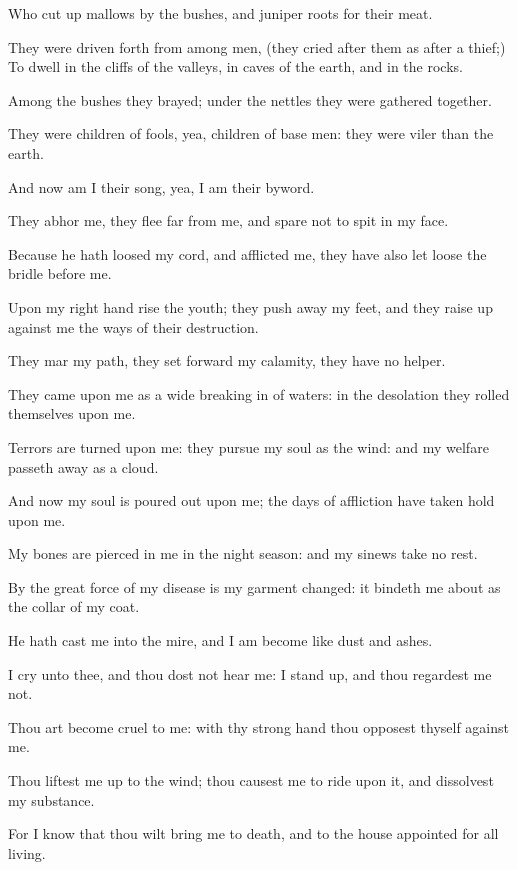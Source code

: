 \verse Who cut up mallows by the bushes, and juniper roots for their meat.

\verse They were driven forth from among men, (they cried after them as after a thief;) \verse To dwell in the cliffs of the valleys, in caves of the earth, and in the rocks.

\verse Among the bushes they brayed; under the nettles they were gathered together.

\verse They were children of fools, yea, children of base men: they were viler than the earth.

\verse And now am I their song, yea, I am their byword.

\verse They abhor me, they flee far from me, and spare not to spit in my face.

\verse Because he hath loosed my cord, and afflicted me, they have also let loose the bridle before me.

\verse Upon my right hand rise the youth; they push away my feet, and they raise up against me the ways of their destruction.

\verse They mar my path, they set forward my calamity, they have no helper.

\verse They came upon me as a wide breaking in of waters: in the desolation they rolled themselves upon me.

\verse Terrors are turned upon me: they pursue my soul as the wind: and my welfare passeth away as a cloud.

\verse And now my soul is poured out upon me; the days of affliction have taken hold upon me.

\verse My bones are pierced in me in the night season: and my sinews take no rest.

\verse By the great force of my disease is my garment changed: it bindeth me about as the collar of my coat.

\verse He hath cast me into the mire, and I am become like dust and ashes.

\verse I cry unto thee, and thou dost not hear me: I stand up, and thou regardest me not.

\verse Thou art become cruel to me: with thy strong hand thou opposest thyself against me.

\verse Thou liftest me up to the wind; thou causest me to ride upon it, and dissolvest my substance.

\verse For I know that thou wilt bring me to death, and to the house appointed for all living.

